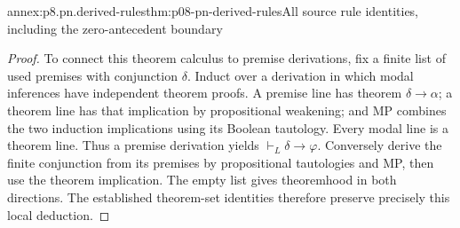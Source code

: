 \begin{annexitem}{annex:p8.pn.derived-rules}{thm:p08-pn-derived-rules}{All source rule identities, including the zero-antecedent boundary}
\begin{proof}
To connect this theorem calculus to premise derivations, fix a
finite list of used premises with conjunction \(\delta\).
Induct over a derivation in which modal inferences have independent
theorem proofs. A premise line has theorem \(\delta\to\alpha\);
a theorem line has that implication by propositional weakening;
and MP combines the two induction implications using its Boolean
tautology. Every modal line is a theorem line. Thus a premise
derivation yields \(\vdash_L\delta\to\varphi\).
Conversely derive the finite conjunction from its premises by
propositional tautologies and MP, then use the theorem implication.
The empty list gives theoremhood in both directions. The established
theorem-set identities therefore preserve precisely this local deduction.
\end{proof}
\end{annexitem}


